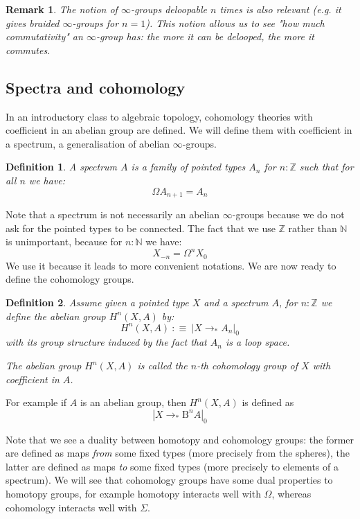 \documentclass{article}
\newcommand{\sse}[1]{\medbreak \subsection{#1}}
\renewcommand{\r}{\rightarrow}
\newcommand{\B}{\mathrm{B}}
\newtheorem{definition}{Definition}
\newtheorem{remark}{Remark}
\begin{document}
\begin{remark}
The notion of $\infty$-groups deloopable $n$ times is also relevant (e.g. it gives braided $\infty$-groups for $n=1$). This notion allows us to see "how much commutativity" an $\infty$-group has: the more it can be delooped, the more it commutes.
\end{remark}




\sse{Spectra and cohomology}

In an introductory class to algebraic topology, cohomology theories with coefficient in an abelian group are defined. We will define them with coefficient in a spectrum, a generalisation of abelian $\infty$-groups.%

\begin{definition}
A spectrum $A$ is a family of pointed types $A_n$ for $n:\mathbb{Z}$ such that for all $n$ we have:
\[\Omega A_{n+1} = A_n\]
\end{definition}

Note that a spectrum is not necessarily an abelian $\infty$-groups because we do not ask for the pointed types to be connected. The fact that we use $\mathbb{Z}$ rather than $\mathbb{N}$ is unimportant, because for $n:\mathbb{N}$ we have: 
\[X_{-n} = \Omega^n X_0\]
We use it because it leads to more convenient notations. We are now ready to define the cohomology groups.

\begin{definition}
Assume given a pointed type $X$ and a spectrum $A$, for $n:\mathbb{Z}$ we define the abelian group $H^n(X,A)$ by: 
\[H^n(X,A)\ :\equiv\ |X\r_* A_n|_0\]
with its group structure induced by the fact that $A_n$ is a loop space.

The abelian group $H^n(X,A)$ is called the $n$-th cohomology group of $X$ with coefficient in $A$.
\end{definition}

For example if $A$ is an abelian group, then $H^n(X,A)$ is defined as
\[|X\r_* \B^n A|_0\]

Note that we see a duality between homotopy and cohomology groups: the former are defined as maps \emph{from} some fixed types (more precisely from the spheres), the latter are defined as maps \emph{to} some fixed types (more precisely to elements of a spectrum). We will see that cohomology groups have some dual properties to homotopy groups, for example homotopy interacts well with $\Omega$, whereas cohomology interacts well with $\Sigma$. 
\end{document}
